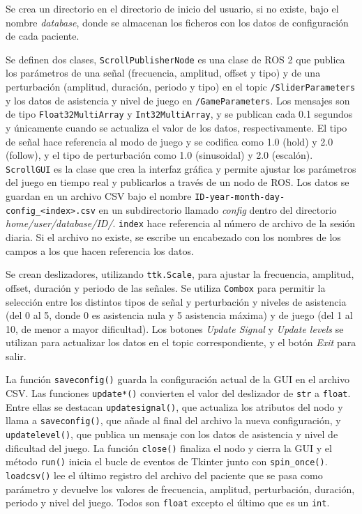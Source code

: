Se crea un directorio en el directorio de inicio del usuario, si no existe, bajo el nombre \textit{database}, donde se almacenan los ficheros con los datos de configuración de cada paciente.

Se definen dos clases, \verb|ScrollPublisherNode| es una clase de ROS 2 que publica los parámetros de una señal (frecuencia, amplitud, offset y tipo) y de una perturbación (amplitud, duración, periodo y tipo) en el topic \verb|/SliderParameters| y los datos de asistencia y nivel de juego en \verb|/GameParameters|.
Los mensajes son de tipo \verb|Float32MultiArray| y \verb|Int32MultiArray|, y se publican cada 0.1 segundos y únicamente cuando se actualiza el valor de los datos, respectivamente.
El tipo de señal hace referencia al modo de juego y se codifica como 1.0 (hold) y 2.0 (follow), y el tipo de perturbación como 1.0 (sinusoidal) y 2.0 (escalón).
\verb|ScrollGUI| es la clase que crea la interfaz gráfica y permite ajustar los parámetros del juego en tiempo real y publicarlos a través de un nodo de ROS.
Los datos se guardan en un archivo CSV bajo el nombre \verb|ID-year-month-day-config_<index>.csv| en un subdirectorio llamado \textit{config} dentro del directorio \textit{home/user/database/ID/}.
\verb|index| hace referencia al número de archivo de la sesión diaria.
Si el archivo no existe, se escribe un encabezado con los nombres de los campos a los que hacen referencia los datos.

Se crean deslizadores, utilizando \verb|ttk.Scale|, para ajustar la frecuencia, amplitud, offset, duración y periodo de las señales.
Se utiliza \verb|Combox| para permitir la selección entre los distintos tipos de señal y perturbación y niveles de asistencia (del 0 al 5, donde 0 es asistencia nula y 5 asistencia máxima) y de juego (del 1 al 10, de menor a mayor dificultad).
Los botones \textit{Update Signal} y \textit{Update levels} se utilizan para actualizar los datos en el topic correspondiente, y el botón \textit{Exit} para salir.

La función \verb|saveconfig()| guarda la configuración actual de la GUI en el archivo CSV.
Las funciones \verb|update*()| convierten el valor del deslizador de \verb|str| a \verb|float|.
Entre ellas se destacan \verb|updatesignal()|, que actualiza los atributos del nodo y llama a \verb|saveconfig()|, que añade al final del archivo la nueva configuración, y \verb|updatelevel()|, que publica un mensaje con los datos de asistencia y nivel de dificultad del juego.
La función \verb|close()| finaliza el nodo y cierra la GUI y el método \verb|run()| inicia el bucle de eventos de Tkinter junto con \verb|spin_once()|.
\verb|loadcsv()| lee el último registro del archivo del paciente que se pasa como parámetro y devuelve los valores de frecuencia, amplitud, perturbación, duración, periodo y nivel del juego.
Todos son \verb|float| excepto el último que es un \verb|int|.


